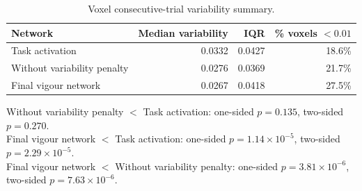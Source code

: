 \begin{table}[htbp]
\centering
\caption{Voxel consecutive-trial variability summary.}
\label{tab:voxel-trial-variability}
\begin{tabular}{lrrr}
\hline
Network & Median variability & IQR & \% voxels $< 0.01$ \\
\hline
Task activation & 0.0332 & 0.0427 & 18.6\% \\
Without variability penalty & 0.0276 & 0.0369 & 21.7\% \\
Final vigour network & 0.0267 & 0.0418 & 27.5\% \\
\hline
\end{tabular}
\vspace{0.4em}
\begin{minipage}{0.96\linewidth}
\footnotesize
Without variability penalty $<$ Task activation: one-sided $p=0.135$, two-sided $p=0.270$. \\
Final vigour network $<$ Task activation: one-sided $p=1.14\times 10^{-5}$, two-sided $p=2.29\times 10^{-5}$. \\
Final vigour network $<$ Without variability penalty: one-sided $p=3.81\times 10^{-6}$, two-sided $p=7.63\times 10^{-6}$. \\
\end{minipage}
\end{table}
